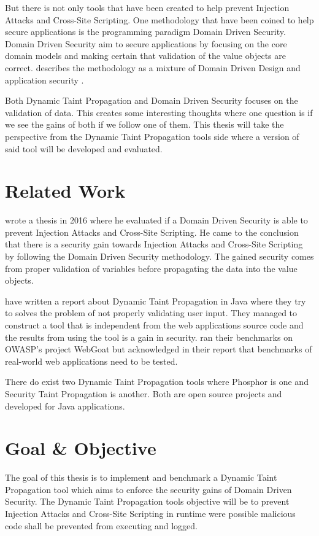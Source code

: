 \documentclass{../kththesis}
\begin{document}
But there is not only tools that have been created to help prevent Injection Attacks and Cross-Site Scripting. One methodology that have been coined to help secure applications is the programming paradigm Domain Driven Security. Domain Driven Security aim to secure applications by focusing on the core domain models and making certain that validation of the value objects are correct. \textcite{Wilander2009} describes the methodology as a mixture of Domain Driven Design and application security \parencite{Wilander2009, Johnsson2009}.

Both Dynamic Taint Propagation and Domain Driven Security focuses on the validation of data. This creates some interesting thoughts where one question is if we see the gains of both if we follow one of them. This thesis will take the perspective from the Dynamic Taint Propagation tools side where a version of said tool will be developed and evaluated. 



\section{Related Work}
\textcite{Stendahl2016} wrote a thesis in 2016 where he evaluated if a Domain Driven Security is able to prevent Injection Attacks and Cross-Site Scripting. He came to the conclusion that there is a security gain towards Injection Attacks and Cross-Site Scripting by following the Domain Driven Security methodology. The gained security comes from proper validation of variables before propagating the data into the value objects.

\textcite{Haldar} have written a report about Dynamic Taint Propagation in Java where they try to solves the problem of not properly validating user input. They managed to construct a tool that is independent from the web applications source code and the results from using the tool is a gain in security. \textcite{Haldar} ran their benchmarks on OWASP's project WebGoat \parencite{webgoat} but acknowledged in their report that benchmarks of real-world web applications need to be tested.

There do exist two Dynamic Taint Propagation tools where Phosphor \parencite{phosphor} is one and Security Taint Propagation \parencite{securityTaint} is another. Both are open source projects and developed for Java applications.


\section{Goal \& Objective}
The goal of this thesis is to implement and benchmark a Dynamic Taint Propagation tool which aims to enforce the security gains of Domain Driven Security. The Dynamic Taint Propagation tools objective will be to prevent Injection Attacks and Cross-Site Scripting in runtime were possible malicious code shall be prevented from executing and logged.
\end{document}
